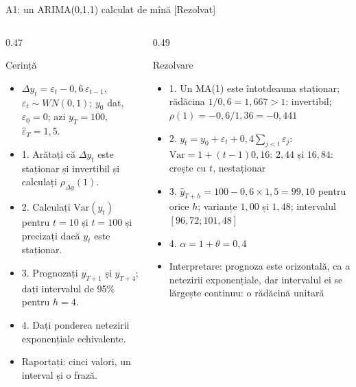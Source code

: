 \begin{frame}{A1: un ARIMA(0,1,1) calculat de mînă [Rezolvat]}
\itemsize{\scriptsize}
\begin{columns}[T]
\begin{column}{0.47\textwidth}
\begin{block}{Cerință}
\begin{itemize}
    \item $\Delta y_t = \varepsilon_t - 0{,}6\,\varepsilon_{t-1}$, $\varepsilon_t \sim WN(0, 1)$; $y_0$ dat, $\varepsilon_0 = 0$; azi $y_T = 100$, $\hat\varepsilon_T = 1{,}5$.
    \item 1. Arătați că $\Delta y_t$ este staționar și invertibil și calculați $\rho_{\Delta y}(1)$.
    \item 2. Calculați $\mathrm{Var}(y_t)$ pentru $t = 10$ și $t = 100$ și precizați dacă $y_t$ este staționar.
    \item 3. Prognozați $y_{T+1}$ și $y_{T+4}$; dați intervalul de 95\% pentru $h = 4$.
    \item 4. Dați ponderea netezirii exponențiale echivalente.
    \item Raportați: cinci valori, un interval și o frază.
\end{itemize}
\end{block}
\end{column}
\begin{column}{0.49\textwidth}
\begin{exampleblock}{Rezolvare}
\begin{itemize}
    \item 1. Un MA(1) este întotdeauna staționar; rădăcina $1/0{,}6 = 1{,}667 > 1$: invertibil; $\rho(1) = -0{,}6/1{,}36 = \ensuremath{-}0{,}441$
    \item 2. $y_t = y_0 + \varepsilon_t + 0{,}4\sum_{j<t}\varepsilon_j$: $\mathrm{Var} = 1 + (t - 1)0{,}16$: $2{,}44$ și $16{,}84$: crește cu $t$, nestaționar
    \item 3. $\hat y_{T+h} = 100 - 0{,}6 \times 1{,}5 = 99{,}10$ pentru orice $h$; varianțe $1{,}00$ și $1{,}48$; intervalul $[96{,}72; 101{,}48]$
    \item 4. $\alpha = 1 + \theta = 0{,}4$
    \item Interpretare: prognoza este orizontală, ca a netezirii exponențiale, dar intervalul ei se lărgește continuu: o rădăcină unitară
\end{itemize}
\end{exampleblock}
\end{column}
\end{columns}
\end{frame}


